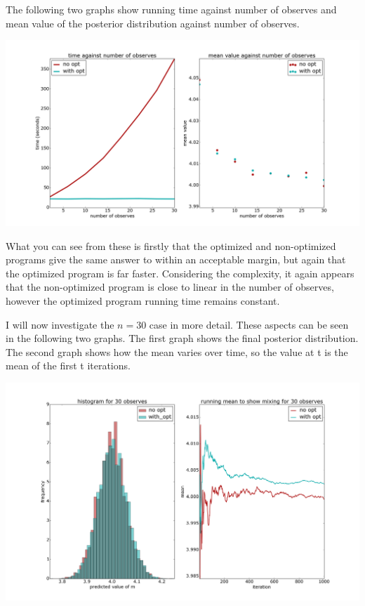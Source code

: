 \documentclass[a4paper]{article}
\begin{document}
The following two graphs show running time against number of observes and mean value of the posterior distribution against number of observes.

\centerline{\includegraphics[width=16cm]{images/merging_consecutive_observes_1.png}}

What you can see from these is firstly that the optimized and non-optimized programs give the same answer to within an acceptable margin, but again that the optimized program is far faster. Considering the complexity, it again appears that the non-optimized program is close to linear in the number of observes, however the optimized program running time remains constant.

I will now investigate the \(n = 30\) case in more detail. These aspects can be seen in the following two graphs. The first graph shows the final posterior distribution. The second graph shows how the mean varies over time, so the value at t is the mean of the first t iterations.

\centerline{\includegraphics[width=16cm]{images/merging_consecutive_observes_2.png}}
\end{document}
